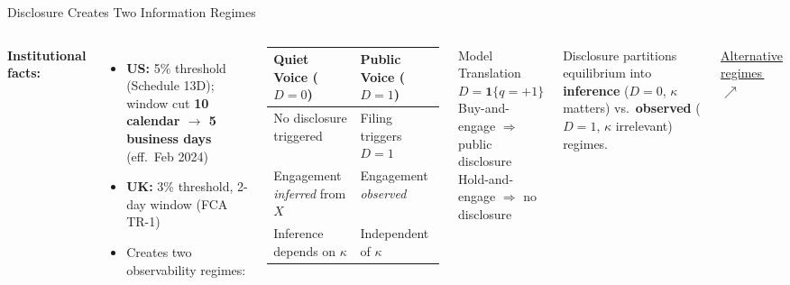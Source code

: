 \documentclass[aspectratio=169,10pt]{beamer}
\newcommand{\1}{\mathbf{1}}
\newcommand{\backuplink}[2]{%
  \hfill{\scriptsize\hyperlink{#1}{\textcolor{brightblue}{#2\,$\nearrow$}}}%
}
\begin{document}
\begin{frame}{Disclosure Creates Two Information Regimes}
\hypertarget{main:disclosure}{}
\begin{columns}[T,onlytextwidth]
\textbf{Institutional facts:}
\begin{itemize}\itemsep0.1em
  \item \textbf{US:} 5\% threshold (Schedule 13D); window cut
        \textbf{10 calendar $\to$ 5 business days} (eff.\ Feb 2024)
  \item \textbf{UK:} 3\% threshold, 2-day window (FCA TR-1)
  \item Creates two observability regimes:
\end{itemize}

\vspace{0.3em}

\scriptsize
\begin{tabular}{ll}
\toprule
\textbf{Quiet Voice} ($D{=}0$) & \textbf{Public Voice} ($D{=}1$) \\
\midrule
No disclosure triggered & Filing triggers $D{=}1$ \\
Engagement \emph{inferred} from $X$ & Engagement \emph{observed} \\
Inference depends on $\kappa$ & Independent of $\kappa$ \\
\bottomrule
\end{tabular}
\normalsize

\begin{block}{Model Translation}
\vspace{0.2em}
$D = \1\{q = +1\}$\\[0.3em]
Buy-and-engage $\Rightarrow$ public disclosure\\
Hold-and-engage $\Rightarrow$ no disclosure
\end{block}

\vspace{0.3em}

{\footnotesize Disclosure partitions equilibrium into \textbf{inference} ($D{=}0$, $\kappa$ matters) vs.\ \textbf{observed} ($D{=}1$, $\kappa$ irrelevant) regimes.}

\backuplink{backup:disclosure_regimes}{Alternative regimes}
\end{columns}
\end{frame}
\end{document}
